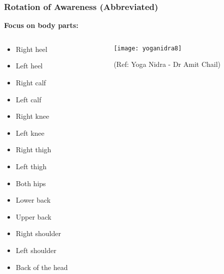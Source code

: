 \begin{frame}[fragile]\frametitle{Rotation of Awareness (Abbreviated)}
    \textbf{Focus on body parts:}

\begin{columns}
    \begin{column}[T]{0.3\linewidth}
    \begin{itemize}
        \item Right heel
        \item Left heel
        \item Right calf
        \item Left calf
        \item Right knee
        \item Left knee
        \item Right thigh
        \item Left thigh
        \item Both hips
        \item Lower back
        \item Upper back
        \item Right shoulder
        \item Left shoulder
        \item Back of the head
    \end{itemize}

    \end{column}
    \begin{column}[T]{0.7\linewidth}
	      \begin{center}
        \texttt{[image: yoganidra8]}

		{\tiny (Ref: Yoga Nidra - Dr Amit Chail)}		
        \end{center}
    \end{column}
  \end{columns}
  
  

	
	
\end{frame}

